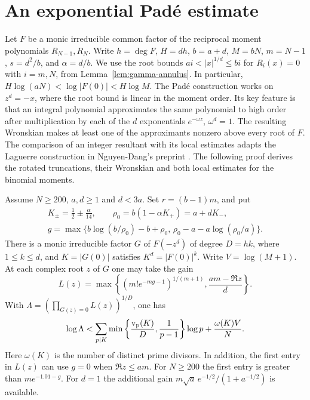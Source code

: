 \section{An exponential Padé estimate}\label{sec:pade}

Let \(F\) be a monic irreducible common factor of the reciprocal
moment polynomials \(R_{N-1},R_N\). Write \(h=\deg F\), \(H=dh\),
\(b=a+d\), \(M=bN\), \(m=N-1\), \(s=d^2/b\), and \(\alpha=d/b\).
We use the root bounds \(ai<|x|^{1/d}\le bi\) for \(R_i(x)=0\)
with \(i=m,N\), from Lemma~\ref{lem:gamma-annulus}. In particular,
\(H\log(aN)<\log|F(0)|<H\log M\). The Padé construction works on
\(z^d=-x\), where the root bound is linear in the moment order.
Its key feature is that an integral polynomial approximates the
same polynomial to high order after multiplication by each of the
\(d\) exponentials \(e^{-\omega z}\), \(\omega^d=1\).
The resulting Wronskian makes at least one of the approximants
nonzero above every root of \(F\). The comparison of an integer
resultant with its local estimates adapts the Laguerre construction
in Nguyen-Dang's preprint \cite[Proposition~3.9]{nguyen-dang}.
The following proof derives the rotated truncations, their
Wronskian and both local estimates for the binomial moments.

\begin{lemma}\label{lem:resultant}
Assume \(N\ge200\), \(a,d\ge1\) and \(d<3a\). Set
\(r=(b-1)m\), and put
\[
 \begin{gathered}
 K_\pm=\tfrac12\pm\tfrac{\alpha}{14},\qquad
 \rho_0=b(1-\alpha K_+)=a+dK_-,\\
 g=\max\{b\log(b/\rho_0)-b+\rho_0,\,
          \rho_0-a-a\log(\rho_0/a)\}.
 \end{gathered}
\]
There is a monic irreducible factor \(G\) of \(F(-z^d)\) of degree
\(D=hk\), where \(1\le k\le d\), and \(K=|G(0)|\) satisfies
\(K^d=|F(0)|^k\). Write \(V=\log(M+1)\).
At each complex root \(z\) of \(G\) one may take the gain
\[
 L(z)=\max\left\{(m!e^{-mg-1})^{1/(m+1)},
                    \frac{am-\Re z}{d}\right\}.
\]
With \(\Lambda=(\prod_{G(z)=0}L(z))^{1/D}\), one has
\begin{equation}\label{eq:pade-norm}
 \log\Lambda<
 \sum_{p\mid K}\min\left\{\frac{\operatorname{v_p}(K)}{D},\frac1{p-1}\right\}\log p
 +\frac{\omega(K)V}{N}.
\end{equation}
Here \(\omega(K)\) is the number of distinct prime divisors.
In addition, the first entry in \(L(z)\) can use \(g=0\)
when \(\Re z\le am\). For \(N\ge200\) the first entry is
greater than \(me^{-1.01-g}\). For \(d=1\) the additional gain
\(m\sqrt a\,e^{-1/2}/(1+a^{-1/2})\) is available.
\end{lemma}

